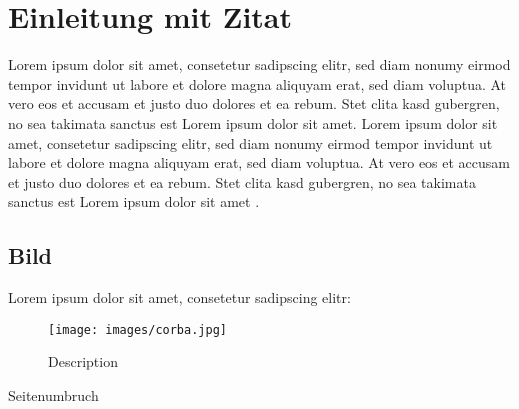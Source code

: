 
\section{Einleitung mit Zitat}

Lorem ipsum dolor sit amet, consetetur sadipscing elitr, sed diam nonumy eirmod tempor invidunt ut labore et dolore magna aliquyam erat, sed diam voluptua. At vero eos et accusam et justo duo dolores et ea rebum. Stet clita kasd gubergren, no sea takimata sanctus est Lorem ipsum dolor sit amet. Lorem ipsum dolor sit amet, consetetur sadipscing elitr, sed diam nonumy eirmod tempor invidunt ut labore et dolore magna aliquyam erat, sed diam voluptua. At vero eos et accusam et justo duo dolores et ea rebum. Stet clita kasd gubergren, no sea takimata sanctus est Lorem ipsum dolor sit amet \cite{tanenbaum2007verteilte}. 

\subsection{Bild}

Lorem ipsum dolor sit amet, consetetur sadipscing elitr:

\begin{figure}[!h]
	\begin{center}
		\texttt{[image: images/corba.jpg]}
		\caption{Description}
		\label{titel}
	\end{center}
\end{figure}

Seitenumbruch

\clearpage